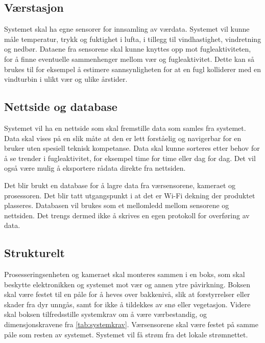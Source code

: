 \newpage
\subsection{Værstasjon}\label{sec:design:vaerstasjon}
Systemet skal ha egne sensorer for innsamling av værdata. 
Systemet vil kunne måle temperatur, trykk og fuktighet i lufta, i tillegg til vindhastighet, vindretning og nedbør.
Dataene fra sensorene skal kunne knyttes opp mot fugleaktiviteten, for å finne eventuelle sammenhenger mellom vær og fugleaktivitet. 
Dette kan så brukes til for eksempel å estimere sannsynligheten for at en fugl kolliderer med en vindturbin i ulikt vær og ulike årstider.

\subsection{Nettside og database}\label{sec:design:nettside}

Systemet vil ha en nettside som skal fremstille data som samles fra systemet. 
Data skal vises på en slik måte at den er lett forståelig og navigerbar for en bruker uten spesiell teknisk kompetanse. 
Data skal kunne sorteres etter behov for å se trender i fugleaktivitet, for eksempel time for time eller dag for dag. 
Det vil også være mulig å eksportere rådata direkte fra nettsiden. 

Det blir brukt en database for å lagre data fra værsensorene, kameraet og prosessoren. Det blir tatt utgangspunkt i at det er Wi-Fi dekning der produktet plasseres. Databasen vil brukes som et mellomledd mellom sensorene og nettsiden. Det trengs dermed ikke å skrives en egen protokoll for overføring av data.

\subsection{Strukturelt}\label{sec:design:strukturelt}

Prosesseringsenheten og kameraet skal monteres sammen i en boks, som skal beskytte elektronikken og systemet mot vær og annen ytre påvirkning. 
Boksen skal være festet til en påle for å heves over bakkenivå, slik at forstyrrelser eller skader fra dyr unngås, samt for ikke å tildekkes av snø eller vegetasjon.
Videre skal boksen tilfredsstille systemkrav  om å være værbestandig, og dimensjonskravene  fra \autoref{tab:systemkrav}. 
Værsensorene skal være festet på samme påle som resten av systemet. 
Systemet vil få strøm fra det lokale strømnettet.



